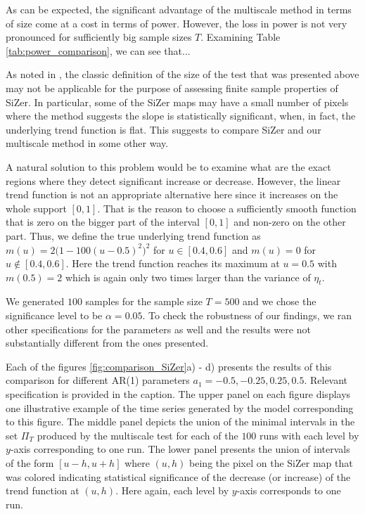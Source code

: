 \documentclass[a4paper,12pt]{article}
\begin{document}
As can be expected, the significant advantage of the multiscale method in terms of size come at a cost in terms of power. However, the loss in power is not very pronounced for sufficiently big sample sizes $T$. Examining Table \ref{tab:power_comparison}, we can see that...

As noted in \cite{HannigMarron2006}, the classic definition of the size of the test that was presented above may not be applicable for the purpose of assessing finite sample properties of SiZer. In particular, some of the SiZer maps may have a small number of pixels where the method suggests the slope is statistically significant, when, in fact, the underlying trend function is flat. This suggests to compare SiZer and our multiscale method in some other way.

A natural solution to this problem would be to examine what are the exact regions where they detect significant increase or decrease. However, the linear trend function is not an appropriate alternative here since it increases on the whole support $[0, 1]$. That is the reason to choose a sufficiently smooth function that is zero on the bigger part of the interval $[0, 1]$ and non-zero on the other part. Thus, we define the true underlying trend function as $m(u) = 2\big(1 - 100(u - 0.5)^2\big)^2$ for $u \in [0.4, 0.6]$ and $m(u) = 0$ for $u \notin [0.4, 0.6]$. Here the trend function reaches its maximum at $u = 0.5$ with $m(0.5) = 2$ which is again only two times larger than the variance of $\eta_t$.

We generated $100$ samples for the sample size $T = 500$ and we chose the significance level to be $\alpha = 0.05$. To check the robustness of our findings, we ran other specifications for the parameters as well and the results were not substantially different from the ones presented.

Each of the figures \ref{fig:comparison_SiZer}a) - d)  presents the results of this comparison for different AR(1) parameters $a_1 = -0.5, -0.25, 0.25, 0.5$. Relevant specification is provided in the caption. The upper panel on each figure displays one illustrative example of the time series generated by the model corresponding to this figure. The middle panel depicts the union of the minimal intervals in the set $\Pi_T$ produced by the multiscale test for each of the $100$ runs with each level by $y$-axis corresponding to one run. The lower panel presents the union of intervals of the form $[u - h, u + h]$ where $(u, h)$ being the pixel on the SiZer map that was colored indicating statistical significance of the decrease (or increase) of the trend function at $(u, h)$. Here again, each level by $y$-axis corresponds to one run.
\end{document}
